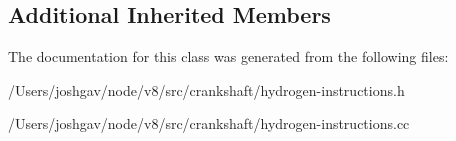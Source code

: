 \subsection*{Additional Inherited Members}


The documentation for this class was generated from the following files\+:\begin{DoxyCompactItemize}
\item 
/\+Users/joshgav/node/v8/src/crankshaft/hydrogen-\/instructions.\+h\item 
/\+Users/joshgav/node/v8/src/crankshaft/hydrogen-\/instructions.\+cc\end{DoxyCompactItemize}

